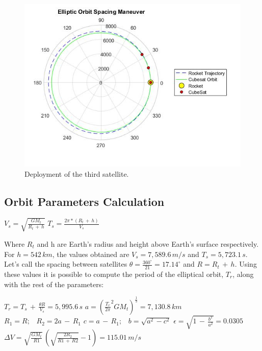 \begin{figure}[H]
\includegraphics[scale=0.7]{./sections/Constellation_Deployment/S4-First_Placement/Images_S4/Picture_7_S4.jpg}
\caption{Deployment of the third satellite.}
\label{orbit5}
\end{figure}

\subsection{Orbit Parameters Calculation}
\begin{center}
$V_s = \sqrt{\frac{GM_t}{R_t\,+\,h}} $
\newline\newline
$T_s = \frac{2\pi*(R_t\,+\,h)}{V_s}$\newline
\end{center}

Where $R_t$ and h are Earth's radius and height above Earth's surface respectively. For $h = 542 \,km$, the values obtained are $V_s = 7,589.6 \,m/s$ and $T_s = 5,723.1 \,s$. Let's call the spacing between satellites $\theta = \frac{360^\circ}{21} = 17.14^\circ$ and $R = R_t \,+ \,h$. Using these values it is possible to compute the period of the elliptical orbit, $T_r$, along with the rest of the parameters:
\newline
\begin{center}
$T_r = T_s\,+\,\frac{\theta R}{V_s} = 5,995.6\,s$
\newline\newline
$a = (\frac{T_r}{2\pi}^2GM_t)^\frac{1}{3}=7,130.8\,km$
\newline\newline
$R_1 = R;\;\;\;R_2=2a\,-\,R_1$
\newline\newline
$c = a\,-\,R_1;\;\;\;b = \sqrt{a^2\,-c^2}$
\newline\newline
$\epsilon = \sqrt{1\,-\,\frac{b^2}{a^2}}=0.0305$
\newline\newline
$\Delta V = \sqrt{\frac{GM_t}{R1}}\,(\sqrt{\frac{2R_2}{R1\,+\,R2}}-1)=115.01\,m/s$
\newline\newline
\end{center}

